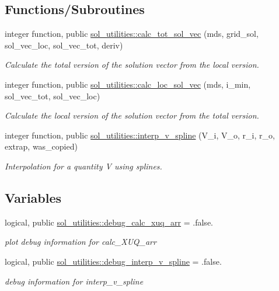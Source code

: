 \subsection*{Functions/\+Subroutines}
\begin{DoxyCompactItemize}
\item 
integer function, public \hyperlink{namespacesol__utilities_a8b902a82ae6a238e725da2cf09e7854f}{sol\+\_\+utilities\+::calc\+\_\+tot\+\_\+sol\+\_\+vec} (mds, grid\+\_\+sol, sol\+\_\+vec\+\_\+loc, sol\+\_\+vec\+\_\+tot, deriv)
\begin{DoxyCompactList}\small\item\em Calculate the total version of the solution vector from the local version. \end{DoxyCompactList}\item 
integer function, public \hyperlink{namespacesol__utilities_a677373f47ee68ad02e9cef5b409bdc26}{sol\+\_\+utilities\+::calc\+\_\+loc\+\_\+sol\+\_\+vec} (mds, i\+\_\+min, sol\+\_\+vec\+\_\+tot, sol\+\_\+vec\+\_\+loc)
\begin{DoxyCompactList}\small\item\em Calculate the local version of the solution vector from the total version. \end{DoxyCompactList}\item 
integer function, public \hyperlink{namespacesol__utilities_a93969085ad0fce8e530493a412b1ce38}{sol\+\_\+utilities\+::interp\+\_\+v\+\_\+spline} (V\+\_\+i, V\+\_\+o, r\+\_\+i, r\+\_\+o, extrap, was\+\_\+copied)
\begin{DoxyCompactList}\small\item\em Interpolation for a quantity V using splines. \end{DoxyCompactList}\end{DoxyCompactItemize}
\subsection*{Variables}
\begin{DoxyCompactItemize}
\item 
logical, public \hyperlink{namespacesol__utilities_a4779ff845b4ddc046892bf4eb4490dd2}{sol\+\_\+utilities\+::debug\+\_\+calc\+\_\+xuq\+\_\+arr} = .false.
\begin{DoxyCompactList}\small\item\em plot debug information for calc\+\_\+\+X\+U\+Q\+\_\+arr \end{DoxyCompactList}\item 
logical, public \hyperlink{namespacesol__utilities_aa36c52e73c02a783074c7c0e5076c903}{sol\+\_\+utilities\+::debug\+\_\+interp\+\_\+v\+\_\+spline} = .false.
\begin{DoxyCompactList}\small\item\em debug information for interp\+\_\+v\+\_\+spline \end{DoxyCompactList}\end{DoxyCompactItemize}

